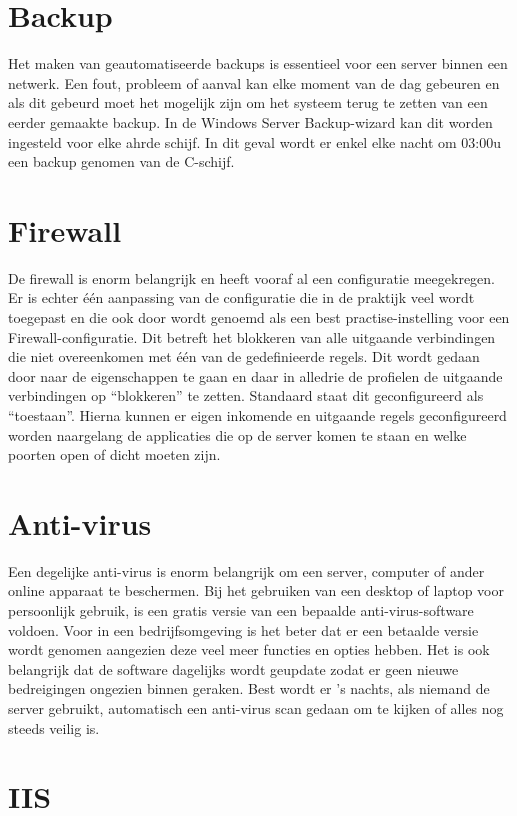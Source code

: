 \documentclass[pdftex,a4paper,12pt]{report}
\begin{document}
\section{Backup}
Het maken van geautomatiseerde backups is essentieel voor een server binnen een netwerk. Een fout, probleem of aanval kan elke moment van de dag gebeuren en als dit gebeurd moet het mogelijk zijn om het systeem terug te zetten van een eerder gemaakte backup. In de Windows Server Backup-wizard kan dit worden ingesteld voor elke ahrde schijf. In dit geval wordt er enkel elke nacht om 03:00u een backup genomen van de C-schijf. 

\section{Firewall}
De firewall is enorm belangrijk en heeft vooraf al een configuratie meegekregen. Er is echter één aanpassing van de configuratie die in de praktijk veel wordt toegepast en die ook door \cite{Nabors2013} wordt genoemd als een best practise-instelling voor een Firewall-configuratie. Dit betreft het blokkeren van alle uitgaande verbindingen die niet overeenkomen met één van de gedefinieerde regels. Dit wordt gedaan door naar de eigenschappen te gaan en daar in alledrie de profielen de uitgaande verbindingen op "`blokkeren"' te zetten. Standaard staat dit geconfigureerd als "`toestaan"'. Hierna kunnen er eigen inkomende en uitgaande regels geconfigureerd worden naargelang de applicaties die op de server komen te staan en welke poorten open of dicht moeten zijn.

\section{Anti-virus}
Een degelijke anti-virus is enorm belangrijk om een server, computer of ander online apparaat te beschermen. Bij het gebruiken van een desktop of laptop voor persoonlijk gebruik, is een gratis versie van een bepaalde anti-virus-software voldoen. Voor in een bedrijfsomgeving is het beter dat er een betaalde versie wordt genomen aangezien deze veel meer functies en opties hebben. Het is ook belangrijk dat de software dagelijks wordt geupdate zodat er geen nieuwe bedreigingen ongezien binnen geraken. Best wordt er 's nachts, als niemand de server gebruikt, automatisch een anti-virus scan gedaan om te kijken of alles nog steeds veilig is.

\section{IIS}
\end{document}
